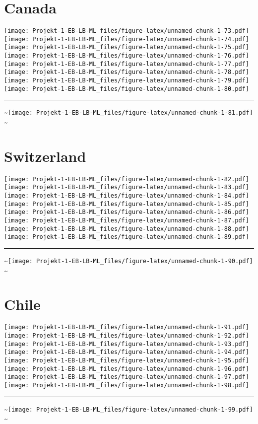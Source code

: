 \documentclass[]{article}
\begin{document}
\section{Canada}\label{canada}

\texttt{[image: Projekt-1-EB-LB-ML\_files/figure-latex/unnamed-chunk-1-73.pdf]}
\texttt{[image: Projekt-1-EB-LB-ML\_files/figure-latex/unnamed-chunk-1-74.pdf]}
\texttt{[image: Projekt-1-EB-LB-ML\_files/figure-latex/unnamed-chunk-1-75.pdf]}
\texttt{[image: Projekt-1-EB-LB-ML\_files/figure-latex/unnamed-chunk-1-76.pdf]}
\texttt{[image: Projekt-1-EB-LB-ML\_files/figure-latex/unnamed-chunk-1-77.pdf]}
\texttt{[image: Projekt-1-EB-LB-ML\_files/figure-latex/unnamed-chunk-1-78.pdf]}
\texttt{[image: Projekt-1-EB-LB-ML\_files/figure-latex/unnamed-chunk-1-79.pdf]}
\texttt{[image: Projekt-1-EB-LB-ML\_files/figure-latex/unnamed-chunk-1-80.pdf]}
\bigskip\hrule\bigskip
\textasciitilde{}\hfill\texttt{[image: Projekt-1-EB-LB-ML\_files/figure-latex/unnamed-chunk-1-81.pdf]}
\hfill \textasciitilde{} \vfill\eject

\section{Switzerland}\label{switzerland}

\texttt{[image: Projekt-1-EB-LB-ML\_files/figure-latex/unnamed-chunk-1-82.pdf]}
\texttt{[image: Projekt-1-EB-LB-ML\_files/figure-latex/unnamed-chunk-1-83.pdf]}
\texttt{[image: Projekt-1-EB-LB-ML\_files/figure-latex/unnamed-chunk-1-84.pdf]}
\texttt{[image: Projekt-1-EB-LB-ML\_files/figure-latex/unnamed-chunk-1-85.pdf]}
\texttt{[image: Projekt-1-EB-LB-ML\_files/figure-latex/unnamed-chunk-1-86.pdf]}
\texttt{[image: Projekt-1-EB-LB-ML\_files/figure-latex/unnamed-chunk-1-87.pdf]}
\texttt{[image: Projekt-1-EB-LB-ML\_files/figure-latex/unnamed-chunk-1-88.pdf]}
\texttt{[image: Projekt-1-EB-LB-ML\_files/figure-latex/unnamed-chunk-1-89.pdf]}
\bigskip\hrule\bigskip
\textasciitilde{}\hfill\texttt{[image: Projekt-1-EB-LB-ML\_files/figure-latex/unnamed-chunk-1-90.pdf]}
\hfill \textasciitilde{} \vfill\eject

\section{Chile}\label{chile}

\texttt{[image: Projekt-1-EB-LB-ML\_files/figure-latex/unnamed-chunk-1-91.pdf]}
\texttt{[image: Projekt-1-EB-LB-ML\_files/figure-latex/unnamed-chunk-1-92.pdf]}
\texttt{[image: Projekt-1-EB-LB-ML\_files/figure-latex/unnamed-chunk-1-93.pdf]}
\texttt{[image: Projekt-1-EB-LB-ML\_files/figure-latex/unnamed-chunk-1-94.pdf]}
\texttt{[image: Projekt-1-EB-LB-ML\_files/figure-latex/unnamed-chunk-1-95.pdf]}
\texttt{[image: Projekt-1-EB-LB-ML\_files/figure-latex/unnamed-chunk-1-96.pdf]}
\texttt{[image: Projekt-1-EB-LB-ML\_files/figure-latex/unnamed-chunk-1-97.pdf]}
\texttt{[image: Projekt-1-EB-LB-ML\_files/figure-latex/unnamed-chunk-1-98.pdf]}
\bigskip\hrule\bigskip
\textasciitilde{}\hfill\texttt{[image: Projekt-1-EB-LB-ML\_files/figure-latex/unnamed-chunk-1-99.pdf]}
\hfill \textasciitilde{} \vfill\eject
\end{document}
